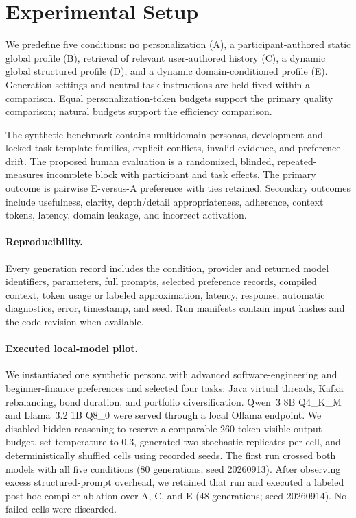 \section{Experimental Setup}
\label{sec:setup}

We predefine five conditions: no personalization (A), a participant-authored
static global profile (B), retrieval of relevant user-authored history (C), a
dynamic global structured profile (D), and a dynamic domain-conditioned profile
(E). Generation settings and neutral task instructions are held fixed within a
comparison. Equal personalization-token budgets support the primary quality
comparison; natural budgets support the efficiency comparison.

The synthetic benchmark contains multidomain personas, development and locked
task-template families, explicit conflicts, invalid evidence, and preference
drift. The proposed human evaluation is a randomized, blinded,
repeated-measures incomplete block with participant and task effects. The primary
outcome is pairwise E-versus-A preference with ties retained. Secondary outcomes
include usefulness, clarity, depth/detail appropriateness, adherence, context
tokens, latency, domain leakage, and incorrect activation.

\paragraph{Reproducibility.} Every generation record includes the condition,
provider and returned model identifiers, parameters, full prompts, selected
preference records, compiled context, token usage or labeled approximation,
latency, response, automatic diagnostics, error, timestamp, and seed. Run
manifests contain input hashes and the code revision when available.

\paragraph{Executed local-model pilot.} We instantiated one synthetic persona with
advanced software-engineering and beginner-finance preferences and selected four
tasks: Java virtual threads, Kafka rebalancing, bond duration, and portfolio
diversification. Qwen~3 8B Q4\_K\_M and Llama~3.2 1B Q8\_0 were served through a
local Ollama endpoint. We disabled hidden reasoning to reserve a comparable
260-token visible-output budget, set temperature to 0.3, generated two stochastic
replicates per cell, and deterministically shuffled cells using recorded seeds.
The first run crossed both models with all five conditions ($80$ generations;
seed 20260913). After observing excess structured-prompt overhead, we retained
that run and executed a labeled post-hoc compiler ablation over A, C, and E
($48$ generations; seed 20260914). No failed cells were discarded.


